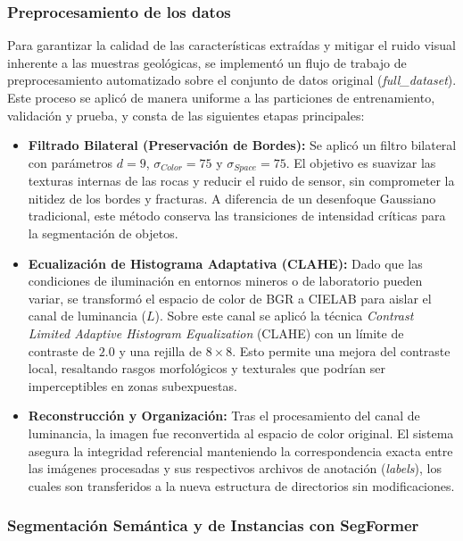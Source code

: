 \subsubsection{Preprocesamiento de los datos}

Para garantizar la calidad de las características extraídas y mitigar el ruido visual inherente a las muestras geológicas, se implementó un flujo de trabajo de preprocesamiento automatizado sobre el conjunto de datos original (\textit{full\_dataset}). Este proceso se aplicó de manera uniforme a las particiones de entrenamiento, validación y prueba, y consta de las siguientes etapas principales:

\begin{itemize}
	\item \textbf{Filtrado Bilateral (Preservación de Bordes):} Se aplicó un filtro bilateral con parámetros $d=9$, $\sigma_{Color}=75$ y $\sigma_{Space}=75$. El objetivo es suavizar las texturas internas de las rocas y reducir el ruido de sensor, sin comprometer la nitidez de los bordes y fracturas. A diferencia de un desenfoque Gaussiano tradicional, este método conserva las transiciones de intensidad críticas para la segmentación de objetos.
	
	\item \textbf{Ecualización de Histograma Adaptativa (CLAHE):} Dado que las condiciones de iluminación en entornos mineros o de laboratorio pueden variar, se transformó el espacio de color de BGR a CIELAB para aislar el canal de luminancia ($L$). Sobre este canal se aplicó la técnica \textit{Contrast Limited Adaptive Histogram Equalization} (CLAHE) con un límite de contraste de $2.0$ y una rejilla de $8 \times 8$. Esto permite una mejora del contraste local, resaltando rasgos morfológicos y texturales que podrían ser imperceptibles en zonas subexpuestas.
	
	\item \textbf{Reconstrucción y Organización:} Tras el procesamiento del canal de luminancia, la imagen fue reconvertida al espacio de color original. El sistema asegura la integridad referencial manteniendo la correspondencia exacta entre las imágenes procesadas y sus respectivos archivos de anotación (\textit{labels}), los cuales son transferidos a la nueva estructura de directorios sin modificaciones.
\end{itemize}


\subsubsection{Segmentación Semántica y de Instancias con SegFormer}

